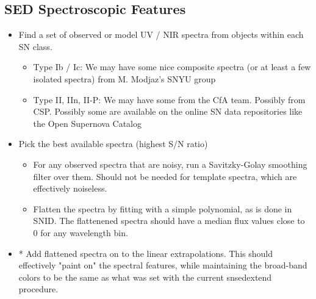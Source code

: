 \subsection{SED Spectroscopic Features}
\begin{itemize}
\item
Find a set of observed or model UV / NIR spectra from objects within each SN class. 
\begin{itemize}
\item
Type Ib / Ic: We may have some nice composite spectra (or at least a few isolated spectra) from M. Modjaz's SNYU group
\item
Type II, IIn, II-P: We may have some from the CfA team.  Possibly from CSP.  Possibly some are available on the online SN data repositories like the Open Supernova Catalog
\end{itemize}
\item
Pick the best available spectra (highest S/N ratio)
\begin{itemize}
\item
For any observed spectra that are noisy, run a Savitzky-Golay smoothing filter over them. Should not be needed for template spectra, which are effectively noiseless.
\item
Flatten the spectra by fitting with a simple polynomial, as is done in SNID. The flattenened spectra should have a median flux values close to 0 for any wavelength bin.   
\end{itemize}
\item
* Add flattened spectra on to the linear extrapolations. This should effectively "paint on" the spectral features, while maintaining the broad-band colors to be the same as what was set with the current snsedextend procedure.
\end{itemize}